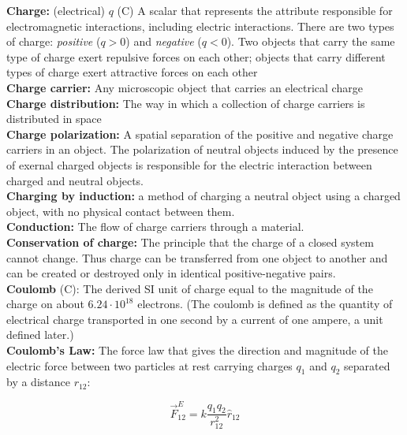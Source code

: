         \textbf{Charge:} (electrical) $q$ (C) A scalar that represents the attribute responsible for electromagnetic interactions, including electric interactions. There are two types of charge: \textit{positive}
        ($q > 0$) and \textit{negative} ($q < 0$). Two objects that carry the same type of charge exert repulsive forces on each other; objects that carry different types of charge exert attractive forces on each other \\
        \textbf{Charge carrier:} Any microscopic object that carries an electrical charge \\
        \textbf{Charge distribution:} The way in which a collection of charge carriers is distributed in space \\
        \textbf{Charge polarization:} A spatial separation of the positive and negative charge carriers in an object. The polarization of neutral objects induced by the presence of exernal charged objects is responsible
        for the electric interaction between charged and neutral objects. \\
        \textbf{Charging by induction:} a method of charging a neutral object using a charged object, with no physical contact between them. \\
        \textbf{Conduction:} The flow of charge carriers through a material. \\
        \textbf{Conservation of charge:} The principle that the charge of a closed system cannot change. Thus charge can be transferred from one object to another and can be created or destroyed only in identical
        positive-negative pairs. \\
        \textbf{Coulomb} (C): The derived SI unit of charge equal to the magnitude of the charge on about $6.24 \cdot 10^{18}$ electrons. (The coulomb is defined as the quantity of electrical charge transported in one
        second by a current of one ampere, a unit defined later.) \\
        \textbf{Coulomb's Law:} The force law that gives the direction and magnitude of the electric force between two particles at rest carrying charges $q_1$ and $q_2$ separated by a distance $r_{12}$:

        \[
            \vec{F}^E_{12} = k \frac{q_1 q_2}{r^2_{12}} \hat{r}_{12}
        \]

